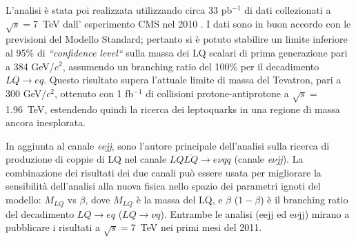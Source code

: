 \documentclass[10pt, a4paper]{article}
\begin{document}
L'analisi \`e stata poi realizzata utilizzando circa 33 pb$^{-1}$ di dati collezionati a $\sqrt{s}=$7~TeV dall' esperimento CMS nel 2010 
\cite{Khachatryan:2010mp,EXO-10-005,AN-2010-230}. 
I dati sono in buon accordo con le previsioni del Modello Standard; pertanto si \`e potuto stabilire un limite inferiore al 95\% di {\it ``confidence level``} 
sulla massa dei LQ scalari di prima generazione pari a 384 GeV/$c^2$, assumendo un branching ratio del 100\% per il decadimento $LQ\rightarrow eq$. 
Questo risultato supera l'attuale limite di massa del Tevatron, pari a 300 GeV/$c^2$, ottenuto con 1 fb$^{-1}$ di collisioni 
protone-antiprotone a $\sqrt{s}=$1.96~TeV, estendendo quindi la ricerca dei leptoquarks in una regione di massa ancora inesplorata. 

In aggiunta al canale {\it eejj}, sono l'autore principale dell'analisi sulla ricerca di produzione di coppie di LQ nel canale 
$LQ\overline{LQ} \rightarrow e\nu qq$ \cite{AN-2010-361} (canale {\it e$\nu$jj}).
La combinazione dei risultati dei due canali pu\`o essere usata per migliorare la 
sensibilit\`a dell'analisi alla nuova fisica nello spazio dei parametri ignoti del modello: $M_{LQ}$ vs $\beta$, 
dove $M_{LQ}$  \`e la massa del LQ, e $\beta$ ($1-\beta$) \`e il branching ratio del decadimento $LQ\rightarrow eq$ 
($LQ\rightarrow \nu q$). Entrambe le analisi (eejj ed e$\nu$jj) mirano a pubblicare i risultati a $\sqrt{s}=$7~TeV nei primi 
mesi del 2011.

\clearpage


\end{document}
